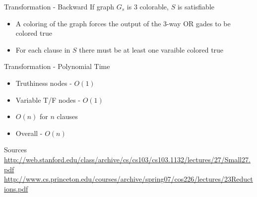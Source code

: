 \documentclass[bigger]{beamer}
\begin{document}
\begin{frame}[label=sec-18]{Transformation - Backward}
If graph \(G_s\) is 3 colorable, \(S\) is satisfiable

\begin{itemize}
\item<1-> A coloring of the graph forces the output of the 3-way OR gades to be colored true
\item<2-> For each clause in \(S\) there must be at least one varaible colored true
\end{itemize}
\end{frame}

\begin{frame}[label=sec-19]{Transformation - Polynomial Time}
\begin{itemize}
\item<1-> Truthiness nodes - \(O(1)\)
\item<2-> Variable T/F nodes - \(O(1)\)
\item<3-> \(O(n)\) for \(n\) clauses
\item<4-> Overall - \(O(n)\)
\end{itemize}
\end{frame}

\begin{frame}[label=sec-20]{Sources}
\url{http://web.stanford.edu/class/archive/cs/cs103/cs103.1132/lectures/27/Small27.pdf}
\url{http://www.cs.princeton.edu/courses/archive/spring07/cos226/lectures/23Reductions.pdf}
\end{frame}
\end{document}
